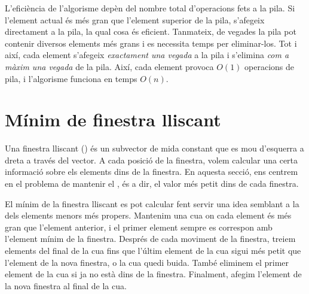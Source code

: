 \begin{center}
\end{center}


L'eficiència de l'algorisme depèn del nombre total d'operacions fets a
la pila. Si l'element actual és més gran que l'element superior de la
pila, s'afegeix directament a la pila, la qual cosa és
eficient. Tanmateix, de vegades la pila pot contenir diversos elements
més grans i es necessita temps per eliminar-los. Tot i així, cada
element s'afegeix \emph{exactament una vegada} a la pila i s'elimina
\emph{com a màxim una vegada} de la pila. Així, cada element provoca
$O(1)$ operacions de pila, i l'algorisme funciona en temps $O(n)$.

\section{Mínim de finestra lliscant}

 

Una finestra lliscant () és un subvector de mida
constant que es mou d'esquerra a dreta a través del vector. A cada
posició de la finestra, volem calcular una certa informació sobre els
elements dins de la finestra. En aquesta secció, ens centrem en el
problema de mantenir el , és a dir, el valor
més petit dins de cada finestra.

El mínim de la finestra lliscant es pot calcular fent servir una idea
semblant a la dels elements menors més propers. Mantenim una cua on
cada element és més gran que l'element anterior, i el primer element
sempre es correspon amb l'element mínim de la finestra. Després de
cada moviment de la finestra, treiem elements del final de la cua fins
que l'últim element de la cua sigui més petit que l'element de la
nova finestra, o la cua quedi buida. També eliminem el primer element
de la cua si ja no està dins de la finestra. Finalment, afegim l'element
de la nova finestra al final de la cua.

